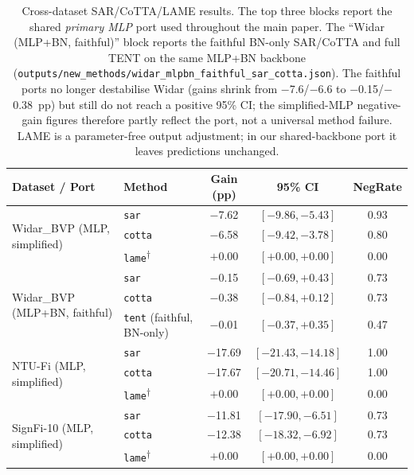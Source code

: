 \begin{table}[h]
\centering
\caption{Cross-dataset SAR/CoTTA/LAME results. The top three blocks report the shared \emph{primary MLP} port used throughout the main paper. The ``Widar (MLP+BN, faithful)'' block reports the faithful BN-only SAR/CoTTA and full TENT on the same MLP+BN backbone (\texttt{outputs/new\_methods/widar\_mlpbn\_faithful\_sar\_cotta.json}). The faithful ports no longer destabilise Widar (gains shrink from $-$7.6/$-$6.6 to $-$0.15/$-$0.38~pp) but still do not reach a positive 95\% CI; the simplified-MLP negative-gain figures therefore partly reflect the port, not a universal method failure. LAME is a parameter-free output adjustment; in our shared-backbone port it leaves predictions unchanged.}
\label{tab:lame_sar_cotta_cross}
\small
\setlength{\tabcolsep}{4pt}
\begin{tabular}{llccc}
\toprule
\textbf{Dataset / Port} & \textbf{Method} & \textbf{Gain (pp)} & \textbf{95\% CI} & \textbf{NegRate} \\
\midrule
\multirow{3}{*}{Widar\_BVP (MLP, simplified)}  & \texttt{sar}   & $-$7.62  & $[-9.86, -5.43]$  & 0.93 \\
                             & \texttt{cotta} & $-$6.58  & $[-9.42, -3.78]$  & 0.80 \\
                             & \texttt{lame}\textsuperscript{$\dagger$} & $+$0.00 & $[+0.00, +0.00]$  & 0.00 \\
\midrule
\multirow{3}{*}{Widar\_BVP (MLP+BN, faithful)} & \texttt{sar}   & $-$0.15 & $[-0.69, +0.43]$ & 0.73 \\
                             & \texttt{cotta} & $-$0.38 & $[-0.84, +0.12]$ & 0.73 \\
                             & \texttt{tent} (faithful, BN-only) & $-$0.01 & $[-0.37, +0.35]$ & 0.47 \\
\midrule
\multirow{3}{*}{NTU-Fi (MLP, simplified)}      & \texttt{sar}   & $-$17.69 & $[-21.43, -14.18]$ & 1.00 \\
                             & \texttt{cotta} & $-$17.67 & $[-20.71, -14.46]$ & 1.00 \\
                             & \texttt{lame}\textsuperscript{$\dagger$} & $+$0.00 & $[+0.00, +0.00]$  & 0.00 \\
\midrule
\multirow{3}{*}{SignFi-10 (MLP, simplified)}   & \texttt{sar}   & $-$11.81 & $[-17.90, -6.51]$ & 0.73 \\
                             & \texttt{cotta} & $-$12.38 & $[-18.32, -6.92]$ & 0.73 \\
                             & \texttt{lame}\textsuperscript{$\dagger$} & $+$0.00 & $[+0.00, +0.00]$  & 0.00 \\
\bottomrule
\end{tabular}
\end{table}


